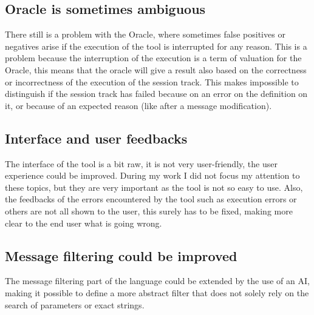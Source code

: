 \subsection{Oracle is sometimes ambiguous}
There still is a problem with the Oracle, where sometimes false positives or negatives arise if the execution of the tool is interrupted for any reason. This is a problem because the interruption of the execution is a term of valuation for the Oracle, this means that the oracle will give a result also based on the correctness or incorrectness of the execution of the \gls{session track}. This makes impossible to distinguish if the \gls{session track} has failed because on an error on the definition on it, or because of an expected reason (like after a message modification).

\subsection{Interface and user feedbacks}
The interface of the tool is a bit raw, it is not very user-friendly, the user experience could be improved. During my work I did not focus my attention to these topics, but they are very important as the tool is not so easy to use. Also, the feedbacks of the errors encountered by the tool such as execution errors or others are not all shown to the user, this surely has to be fixed, making more clear to the end user what is going wrong.

\subsection{Message filtering could be improved}
The message filtering part of the language could be extended by the use of an AI, making it possible to define a more abstract filter that does not solely rely on the search of parameters or exact strings.







